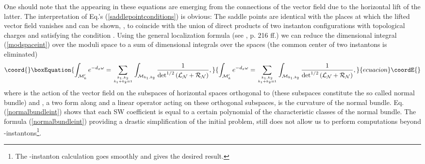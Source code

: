 \documentclass[a4paper,12pt]{article}
\begin{document}
One should note that the \coordHE{} appearing in these
equations are emerging from the \coordHE{} connections of the \coordHE{}
vector field due to the horizontal lift of the latter. The
interpretation of Eq.'s (\ref{saddlepointconditions}) is obvious:
The saddle points are identical with the places at which the
lifted vector field vanishes and can be shown, \cite{H}, to
coincide with the union of direct products of two \coordHE{} instanton
configurations with topological charges \coordHE{} and \coordHE{} satisfying
the condition \coordHE{}. Using the general localization formula
(see \cite{BGV}, p. 216 ff.) we can reduce the \coordHE{} dimensional
integral (\ref{modspaceint}) over the moduli space \coordHE{}
to a sum of \coordHE{} dimensional integrals over the
spaces \coordHE{} (the common center of
two \coordHE{} instantons is eliminated)
\begin{equation}\coord{}\boxEquation{
\int_{{\cal M}'_k} e^{-d_x\omega}=\sum_{\sb {k_1, k_2} \atop k_1+k_2=1} \int_{{\cal M}_{k_1 ,
k_2}}\frac{1}{\det^{1/2} \left({\cal L}_{\cal N}+{\cal R}_{\cal N}\right)}, \label{normalbundleint}
}{
\int_{{\cal M}'_k} e^{-d_x\omega}=\sum_{\sb {k_1, k_2} \atop k_1+k_2=1} \int_{{\cal M}_{k_1 ,
k_2}}\frac{1}{\det^{1/2} \left({\cal L}_{\cal N}+{\cal R}_{\cal N}\right)}, }{ecuacion}\coordE{}\end{equation}
where \coordHE{} is the action of the vector field on the
subspaces of horizontal spaces orthogonal to \coordHE{} (these subspaces constitute the so called normal bundle) and
\coordHE{}, a two form along \coordHE{} and a
linear operator acting on these orthogonal subspaces, is the
curvature of the normal bundle. Eq. (\ref{normalbundleint}) shows
that each SW coefficient \coordHE{} is equal to a certain
polynomial of the characteristic classes of the normal bundle. The
formula (\ref{normalbundleint}) providing a drastic simplification
of the initial problem, still does not allow us to perform
computations beyond \coordHE{}-instantons\footnote{The \coordHE{}-instanton
calculation goes smoothly and gives the desired result.}.
\end{document}
